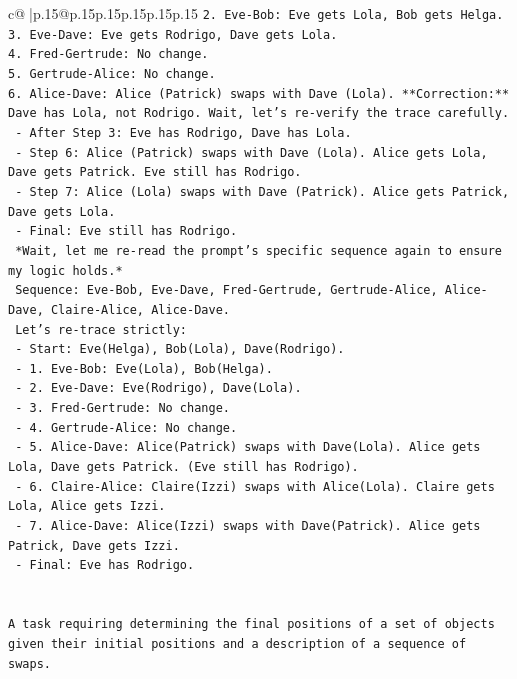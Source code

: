\documentclass{article}
\begin{document}
{\begin{supertabular}{c@{$\;$}|p{.15\linewidth}@{}p{.15\linewidth}p{.15\linewidth}p{.15\linewidth}p{.15\linewidth}p{.15\linewidth}}
{{{\texttt{2. Eve{-}Bob: Eve gets Lola, Bob gets Helga.} \\
\texttt{3. Eve{-}Dave: Eve gets Rodrigo, Dave gets Lola.} \\
\texttt{4. Fred{-}Gertrude: No change.} \\
\texttt{5. Gertrude{-}Alice: No change.} \\
\texttt{6. Alice{-}Dave: Alice (Patrick) swaps with Dave (Lola). **Correction:** Dave has Lola, not Rodrigo. Wait, let's re{-}verify the trace carefully.} \\
\texttt{   {-} After Step 3: Eve has Rodrigo, Dave has Lola.} \\
\texttt{   {-} Step 6: Alice (Patrick) swaps with Dave (Lola). Alice gets Lola, Dave gets Patrick. Eve still has Rodrigo.} \\
\texttt{   {-} Step 7: Alice (Lola) swaps with Dave (Patrick). Alice gets Patrick, Dave gets Lola.} \\
\texttt{   {-} Final: Eve still has Rodrigo.} \\
\texttt{   *Wait, let me re{-}read the prompt's specific sequence again to ensure my logic holds.*} \\
\texttt{   Sequence: Eve{-}Bob, Eve{-}Dave, Fred{-}Gertrude, Gertrude{-}Alice, Alice{-}Dave, Claire{-}Alice, Alice{-}Dave.} \\
\texttt{   Let's re{-}trace strictly:} \\
\texttt{   {-} Start: Eve(Helga), Bob(Lola), Dave(Rodrigo).} \\
\texttt{   {-} 1. Eve{-}Bob: Eve(Lola), Bob(Helga).} \\
\texttt{   {-} 2. Eve{-}Dave: Eve(Rodrigo), Dave(Lola).} \\
\texttt{   {-} 3. Fred{-}Gertrude: No change.} \\
\texttt{   {-} 4. Gertrude{-}Alice: No change.} \\
\texttt{   {-} 5. Alice{-}Dave: Alice(Patrick) swaps with Dave(Lola). Alice gets Lola, Dave gets Patrick. (Eve still has Rodrigo).} \\
\texttt{   {-} 6. Claire{-}Alice: Claire(Izzi) swaps with Alice(Lola). Claire gets Lola, Alice gets Izzi.} \\
\texttt{   {-} 7. Alice{-}Dave: Alice(Izzi) swaps with Dave(Patrick). Alice gets Patrick, Dave gets Izzi.} \\
\texttt{   {-} Final: Eve has Rodrigo.} \\
\\ 
\\ 
\texttt{A task requiring determining the final positions of a set of objects given their initial positions and a description of a sequence of swaps.} \\
}}}
\end{supertabular}}
\end{document}
